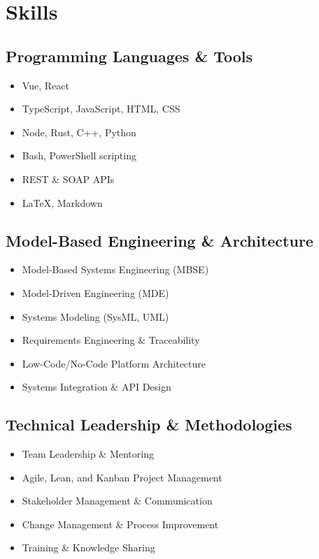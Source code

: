 %
%
\section{Skills}
\subsection{Programming Languages \& Tools}
\begin{itemize}
    \item Vue, React
    \item TypeScript, JavaScript, HTML, CSS
    \item Node, Rust, C++, Python
    \item Bash, PowerShell scripting
    \item REST \& SOAP APIs
    \item \LaTeX, Markdown
\end{itemize}

\subsection{Model-Based Engineering \& Architecture}
\begin{itemize}
    \item Model-Based Systems Engineering (MBSE)
    \item Model-Driven Engineering (MDE)
    \item Systems Modeling (SysML, UML)
    \item Requirements Engineering \& Traceability
    \item Low-Code/No-Code Platform Architecture
    \item Systems Integration \& API Design
\end{itemize}

\subsection{Technical Leadership \& Methodologies}
\begin{itemize}
    \item Team Leadership \& Mentoring
    \item Agile, Lean, and Kanban Project Management
    \item Stakeholder Management \& Communication
    \item Change Management \& Process Improvement
    \item Training \& Knowledge Sharing
\end{itemize}

